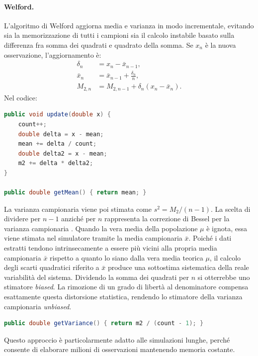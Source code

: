 ﻿\documentclass[a4paper,12pt]{article}
\begin{document}
\paragraph{Welford.}
L'algoritmo di Welford aggiorna media e varianza in modo incrementale, evitando sia la memorizzazione di tutti i campioni sia il calcolo instabile basato sulla differenza fra somma dei quadrati e quadrato della somma. Se $x_n$ è la nuova osservazione, l'aggiornamento è:
\begin{align}
    \delta_n &= x_n - \bar{x}_{n-1},\\
    \bar{x}_n &= \bar{x}_{n-1} + \frac{\delta_n}{n},\\
    M_{2,n} &= M_{2,n-1} + \delta_n(x_n-\bar{x}_n).
\end{align}
Nel codice:
\begin{lstlisting}[language=Java]
public void update(double x) {
    count++;
    double delta = x - mean;
    mean += delta / count;
    double delta2 = x - mean;
    m2 += delta * delta2;
}

public double getMean() { return mean; }
\end{lstlisting}
La varianza campionaria viene poi stimata come $s^2=M_2/(n-1)$. La scelta di dividere per $n-1$ anziché per $n$ rappresenta la correzione di Bessel per la varianza campionaria \cite{leemis-park-book}. Quando la vera media della popolazione $\mu$ è ignota, essa viene stimata nel simulatore tramite la media campionaria $\bar{x}$. Poiché i dati estratti tendono intrinsecamente a essere più vicini alla propria media campionaria $\bar{x}$ rispetto a quanto lo siano dalla vera media teorica $\mu$, il calcolo degli scarti quadratici riferito a $\bar{x}$ produce una sottostima sistematica della reale variabilità del sistema. Dividendo la somma dei quadrati per $n$ si otterrebbe uno stimatore \textit{biased}. La rimozione di un grado di libertà al denominatore compensa esattamente questa distorsione statistica, rendendo lo stimatore della varianza campionaria \textit{unbiased}.
\begin{lstlisting}[language=Java]
public double getVariance() { return m2 / (count - 1); }
\end{lstlisting}
Questo approccio è particolarmente adatto alle simulazioni lunghe, perché consente di elaborare milioni di osservazioni mantenendo memoria costante.
\end{document}
